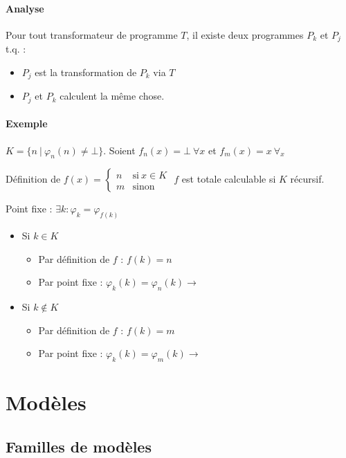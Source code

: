 \subsubsection{Analyse}

Pour tout transformateur de programme $T$, il existe deux programmes $P_k$ et $P_j$ t.q. :
\begin{itemize}
\item $P_j$ est la transformation de $P_k$ via $T$
\item $P_j$ et $P_k$ calculent la même chose.
\end{itemize}

\subsubsection{Exemple}

$K = \{n\ |\ \varphi_n(n) \neq \bot \}$. Soient $f_n(x) = \bot\ \forall x$ et $f_m(x) = x\ \forall_x$

Définition de $f(x) =
\begin{cases}
	n & \text{si}\ x \in K\\
	m & \text{sinon}
\end{cases}$ $f$ est totale calculable si $K$ récursif.

Point fixe : $\exists k : \varphi_k = \varphi_{f(k)}$
\begin{itemize}
\item Si $k \in K$
	\begin{itemize}
	\item Par définition de $f$ : $f(k) = n$
	\item Par point fixe : $\varphi_k (k) = \varphi_n(k) \rightarrow$ 
	\end{itemize}
\item Si $k \notin K$
	\begin{itemize}
	\item Par définition de $f$ : $f(k) = m$
	\item Par point fixe : $\varphi_k(k) = \varphi_m(k) \rightarrow$ 
	\end{itemize}
\end{itemize}

\chapter{Modèles}

\section{Familles de modèles}


